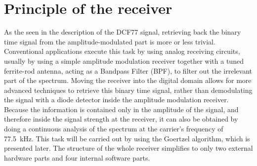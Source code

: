 \documentclass[conference]{IEEEtran}
\begin{document}
\section{Principle of the receiver}
As the seen in the description of the DCF77 signal, retrieving back the binary time signal from the amplitude-modulated part is more or less trivial.
Conventional applications execute this task by using analog receiving circuits, usually by using a simple amplitude modulation receiver together with a
tuned ferrite-rod antenna, acting as a Bandpass Filter (BPF), to filter out the irrelevant part of the spectrum. 
Moving the receiver into the digital domain allows for more advanced techniques to retrieve this binary time signal, rather than demodulating the signal with a
diode detector inside the amplitude modulation receiver.
Because the information is contained only in the amplitude of the signal, and therefore inside the signal strength at the receiver, it can also be obtained by doing a
continuous analysis of the spectrum at the carrier's frequency of \SI{77.5}{\kilo\hertz}.
This task will be carried out by using the Goertzel algorithm, which is presented later.
The structure of the whole receiver simplifies to only two external hardware parts and four internal software parts.
\end{document}
